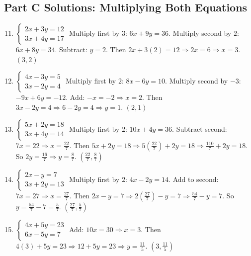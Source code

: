 \documentclass[14pt]{extarticle}
\begin{document}
\subsection*{Part C Solutions: Multiplying Both Equations}
\begin{enumerate}
  \setcounter{enumi}{10}
  \item \(\begin{cases} 2x + 3y = 12 \\ 3x + 4y = 17 \end{cases}\)  
  Multiply first by \(3\): \(6x + 9y = 36\). Multiply second by \(2\): \(6x + 8y = 34\). Subtract: \(y = 2\).  
  Then \(2x + 3(2) = 12 \Rightarrow 2x = 6 \Rightarrow x = 3\).  
  \(\boxed{(3, 2)}\)

  \item \(\begin{cases} 4x - 3y = 5 \\ 3x - 2y = 4 \end{cases}\)  
  Multiply first by \(2\): \(8x - 6y = 10\). Multiply second by \(-3\): \(-9x + 6y = -12\). Add: \(-x = -2 \Rightarrow x = 2\).  
  Then \(3x - 2y = 4 \Rightarrow 6 - 2y = 4 \Rightarrow y = 1\).  
  \(\boxed{(2, 1)}\)

  \item \(\begin{cases} 5x + 2y = 18 \\ 3x + 4y = 14 \end{cases}\)  
  Multiply first by \(2\): \(10x + 4y = 36\). Subtract second: \(7x = 22 \Rightarrow x = \tfrac{22}{7}\).  
  Then \(5x + 2y = 18 \Rightarrow 5(\tfrac{22}{7}) + 2y = 18 \Rightarrow \tfrac{110}{7} + 2y = 18\).  
  So \(2y = \tfrac{16}{7} \Rightarrow y = \tfrac{8}{7}\).  
  \(\boxed{(\tfrac{22}{7}, \tfrac{8}{7})}\)

  \item \(\begin{cases} 2x - y = 7 \\ 3x + 2y = 13 \end{cases}\)  
  Multiply first by \(2\): \(4x - 2y = 14\). Add to second: \(7x = 27 \Rightarrow x = \tfrac{27}{7}\).  
  Then \(2x - y = 7 \Rightarrow 2(\tfrac{27}{7}) - y = 7 \Rightarrow \tfrac{54}{7} - y = 7\).  
  So \(y = \tfrac{54}{7} - 7 = \tfrac{5}{7}\).  
  \(\boxed{(\tfrac{27}{7}, \tfrac{5}{7})}\)

  \item \(\begin{cases} 4x + 5y = 23 \\ 6x - 5y = 7 \end{cases}\)  
  Add: \(10x = 30 \Rightarrow x = 3\). Then \(4(3) + 5y = 23 \Rightarrow 12 + 5y = 23 \Rightarrow y = \tfrac{11}{5}\).  
  \(\boxed{(3, \tfrac{11}{5})}\)
\end{enumerate}
\end{document}
